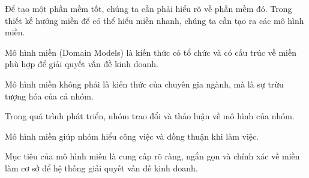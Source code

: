 Để tạo một phần mềm tốt, chúng ta cần phải hiểu rõ về phần mềm đó. Trong thiết kế hướng miền để có thể hiểu miền nhanh, chúng ta cần tạo ra các mô hình miền.

Mô hình miền (Domain Models) là kiến thức có tổ chức và có cấu trúc về miền phù hợp để giải quyết vấn đề kinh doanh.

Mô hình miền không phải là kiến thức của chuyên gia ngành, mà là sự trừu tượng hóa của cả nhóm.

Trong quá trình phát triển, nhóm trao đổi và thảo luận về mô hình của nhóm.

Mô hình miền giúp nhóm hiểu công việc và đồng thuận khi làm việc.

Mục tiêu của mô hình miền là cung cấp rõ ràng, ngắn gọn và chính xác về miền làm cơ sở để hệ thống giải quyết vấn đề kinh doanh.


